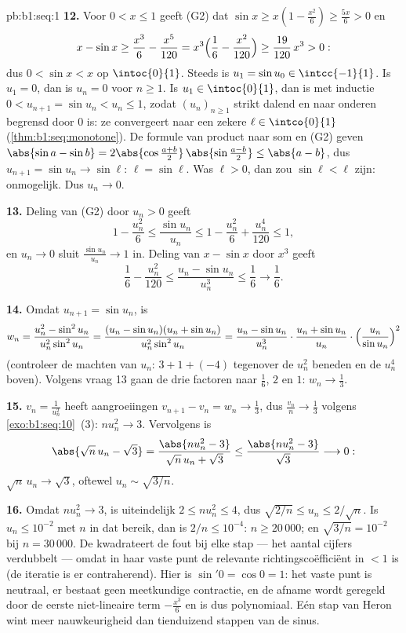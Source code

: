 \begin{solution}{pb:b1:seq:1}
\textbf{12.} Voor $0 < x \leq 1$ geeft (G2) dat $\sin x \geq x(1 -
\frac{x^2}{6}) \geq \frac{5x}{6} > 0$ en
\[
x - \sin x \geq \frac{x^3}{6} - \frac{x^5}{120}
= x^3\Bigl(\frac16 - \frac{x^2}{120}\Bigr)
\geq \frac{19}{120}\,x^3 > 0 :
\]
dus $0 < \sin x < x$ op $\intoc{0}{1}$. Steeds is $u_1 = \sin u_0 \in
\intcc{-1}{1}$. Is $u_1 = 0$, dan is $u_n = 0$ voor $n \geq 1$. Is $u_1
\in \intoc{0}{1}$, dan is met inductie $0 < u_{n+1} = \sin u_n < u_n \leq
1$, zodat $(u_n)_{n\geq1}$ strikt dalend en naar onderen begrensd door
$0$ is: ze convergeert naar een zekere $\ell \in \intco{0}{1}$
(\cref{thm:b1:seq:monotone}). De formule van product naar som en (G2)
geven $\abs{\sin a - \sin b} = 2\abs{\cos \frac{a+b}{2}}\,
\abs{\sin\frac{a-b}{2}} \leq \abs{a - b}$, dus $u_{n+1} = \sin u_n \to
\sin \ell$: $\ell = \sin\ell$. Was $\ell > 0$, dan zou $\sin\ell < \ell$
zijn: onmogelijk. Dus $u_n \to 0$.

\textbf{13.} Deling van (G2) door $u_n > 0$ geeft
\[
1 - \frac{u_n^2}{6} \leq \frac{\sin u_n}{u_n} \leq 1 -
\frac{u_n^2}{6} + \frac{u_n^4}{120} \leq 1 ,
\]
en $u_n \to 0$ sluit $\frac{\sin u_n}{u_n} \to 1$ in. Deling van $x -
\sin x$ door $x^3$ geeft
\[
\frac16 - \frac{u_n^2}{120} \leq \frac{u_n - \sin u_n}{u_n^3}
\leq \frac16 \longrightarrow \frac16 .
\]

\textbf{14.} Omdat $u_{n+1} = \sin u_n$, is
\[
w_n = \frac{u_n^2 - \sin^2 u_n}{u_n^2 \sin^2 u_n}
= \frac{(u_n - \sin u_n)(u_n + \sin u_n)}{u_n^2 \sin^2 u_n}
= \frac{u_n - \sin u_n}{u_n^3}\cdot
\frac{u_n + \sin u_n}{u_n}\cdot
\Bigl(\frac{u_n}{\sin u_n}\Bigr)^{2}
\]
(controleer de machten van $u_n$: $3 + 1 + (-4)$ tegenover de $u_n^2$
beneden en de $u_n^4$ boven). Volgens vraag 13 gaan de drie factoren naar
$\frac16$, $2$ en $1$: $w_n \to \frac13$.

\textbf{15.} $v_n = \frac{1}{u_n^2}$ heeft aangroeiingen $v_{n+1} - v_n =
w_n \to \frac13$, dus $\frac{v_n}{n} \to \frac13$ volgens
\cref{exo:b1:seq:10}~(3): $n u_n^2 \to 3$. Vervolgens is
\[
\abs{\sqrt n\,u_n - \sqrt 3}
= \frac{\abs{n u_n^2 - 3}}{\sqrt n\,u_n + \sqrt 3}
\leq \frac{\abs{n u_n^2 - 3}}{\sqrt 3} \longrightarrow 0 :
\]
$\sqrt n\,u_n \to \sqrt 3$, oftewel $u_n \sim \sqrt{3/n}$.

\textbf{16.} Omdat $n u_n^2 \to 3$, is uiteindelijk $2 \leq n u_n^2 \leq
4$, dus $\sqrt{2/n} \leq u_n \leq 2/\sqrt n$. Is $u_n \leq 10^{-2}$ met
$n$ in dat bereik, dan is $2/n \leq 10^{-4}$: $n \geq 20\,000$; en
$\sqrt{3/n} = 10^{-2}$ bij $n = 30\,000$. De 
kwadrateert de fout bij elke stap --- het aantal cijfers verdubbelt ---
omdat in haar vaste punt de relevante richtingscoëfficiënt in  $<
1$ is (de iteratie is er contraherend). Hier is $\sin' 0 = \cos 0 = 1$:
het vaste punt is neutraal, er bestaat geen meetkundige contractie, en de
afname wordt geregeld door de eerste niet-lineaire term $-\frac{x^3}{6}$
en is dus polynomiaal. Eén stap van Heron wint meer nauwkeurigheid dan
tienduizend stappen van de sinus.


\end{solution}
